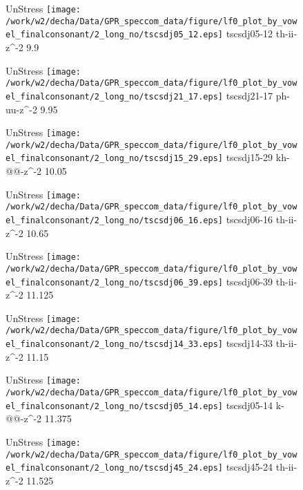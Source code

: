 \documentclass{article}
\begin{document}
\begin{figure}[t]
\begin{minipage}[b]{.24\textwidth}
UnStress
\centering
\texttt{[image: /work/w2/decha/Data/GPR\_speccom\_data/figure/lf0\_plot\_by\_vowel\_finalconsonant/2\_long\_no/tscsdj05\_12.eps]}
tscsdj05-12 th-ii-z\textasciicircum-2 9.9
\end{minipage}
\begin{minipage}[b]{.24\textwidth}
UnStress
\centering
\texttt{[image: /work/w2/decha/Data/GPR\_speccom\_data/figure/lf0\_plot\_by\_vowel\_finalconsonant/2\_long\_no/tscsdj21\_17.eps]}
tscsdj21-17 ph-uu-z\textasciicircum-2 9.95
\end{minipage}
\begin{minipage}[b]{.24\textwidth}
UnStress
\centering
\texttt{[image: /work/w2/decha/Data/GPR\_speccom\_data/figure/lf0\_plot\_by\_vowel\_finalconsonant/2\_long\_no/tscsdj15\_29.eps]}
tscsdj15-29 kh-@@-z\textasciicircum-2 10.05
\end{minipage}
\begin{minipage}[b]{.24\textwidth}
UnStress
\centering
\texttt{[image: /work/w2/decha/Data/GPR\_speccom\_data/figure/lf0\_plot\_by\_vowel\_finalconsonant/2\_long\_no/tscsdj06\_16.eps]}
tscsdj06-16 th-ii-z\textasciicircum-2 10.65
\end{minipage}
\end{figure}

\begin{figure}[t]
\begin{minipage}[b]{.24\textwidth}
UnStress
\centering
\texttt{[image: /work/w2/decha/Data/GPR\_speccom\_data/figure/lf0\_plot\_by\_vowel\_finalconsonant/2\_long\_no/tscsdj06\_39.eps]}
tscsdj06-39 th-ii-z\textasciicircum-2 11.125
\end{minipage}
\begin{minipage}[b]{.24\textwidth}
UnStress
\centering
\texttt{[image: /work/w2/decha/Data/GPR\_speccom\_data/figure/lf0\_plot\_by\_vowel\_finalconsonant/2\_long\_no/tscsdj14\_33.eps]}
tscsdj14-33 th-ii-z\textasciicircum-2 11.15
\end{minipage}
\begin{minipage}[b]{.24\textwidth}
UnStress
\centering
\texttt{[image: /work/w2/decha/Data/GPR\_speccom\_data/figure/lf0\_plot\_by\_vowel\_finalconsonant/2\_long\_no/tscsdj05\_14.eps]}
tscsdj05-14 k-@@-z\textasciicircum-2 11.375
\end{minipage}
\begin{minipage}[b]{.24\textwidth}
UnStress
\centering
\texttt{[image: /work/w2/decha/Data/GPR\_speccom\_data/figure/lf0\_plot\_by\_vowel\_finalconsonant/2\_long\_no/tscsdj45\_24.eps]}
tscsdj45-24 th-ii-z\textasciicircum-2 11.525
\end{minipage}
\end{figure}
\end{document}
